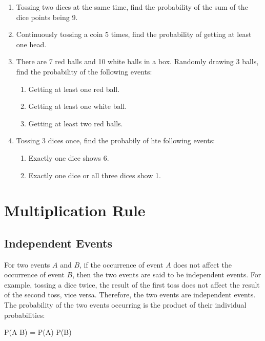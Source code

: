 \documentclass{report}
\begin{document}
\begin{multicols}{2}
\begin{enumerate}
    \item Tossing two dices at the same time, find the probability of the sum of the dice
          points being 9.

    \item Continuously tossing a coin 5 times, find the probability of getting at least
          one head.

    \item There are 7 red balls and 10 white balls in a box. Randomly drawing 3 balls,
          find the probability of the following events:

          \begin{enumerate}
            \item Getting at least one red ball.
            \item Getting at least one white ball.
            \item Getting at least two red balls.
          \end{enumerate}

    \item Tossing 3 dices once, find the probabily of hte following events:
          \begin{enumerate}
            \item Exactly one dice shows 6.
            \item Exactly one dice or all three dices show 1.
          \end{enumerate}
  \end{enumerate}

  \section{Multiplication Rule}

  \subsection*{Independent Events}

  For two events $A$ and $B$, if the occurrence of event $A$ does not affect the
  occurrence of event $B$, then the two events are said to be independent events.
  For example, tossing a dice twice, the result of the first toss does not affect
  the result of the second toss, vice versa. Therefore, the two events are
  independent events. The probability of the two events occurring is the product
  of their individual probabilities:
  \begin{cequation}
    P(A \cap B) = P(A) \cdot P(B)
  \end{cequation}


\end{multicols}
\end{document}

